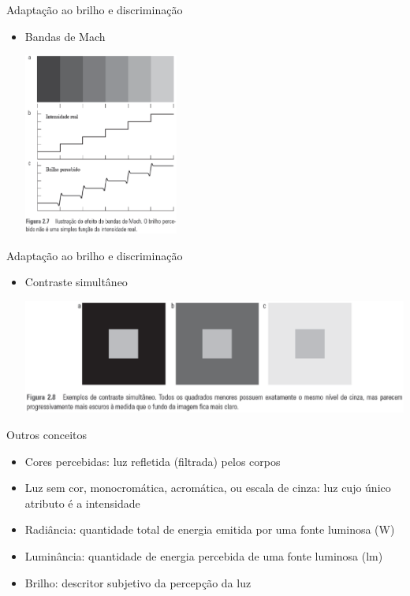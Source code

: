       \begin{slide}[toc=]{Adaptação ao brilho e discriminação}
         \begin{itemize}
            \item Bandas de Mach
            \begin{center}
               \includegraphics[width=0.4\textwidth]{figs/bmach_gw.eps}
            \end{center}
         \end{itemize}
      \end{slide}

      \begin{slide}[toc=]{Adaptação ao brilho e discriminação}
         \begin{itemize}
            \item Contraste simultâneo
            \begin{center}
               \includegraphics[width=\textwidth]{figs/csimul_gw.eps}
            \end{center}
         \end{itemize}
      \end{slide}

     
      \begin{slide}[toc=]{Outros conceitos}
         \begin{itemize}[type=1]
            \item Cores percebidas: luz refletida (filtrada) pelos corpos
            \item Luz sem cor, monocromática, acromática, ou escala de cinza: 
            luz cujo único atributo é a intensidade
            \item Radiância: quantidade total de energia emitida por uma fonte luminosa (W)
            \item Luminância: quantidade de energia percebida de uma fonte luminosa (lm)
            \item Brilho: descritor subjetivo da percepção da luz
         \end{itemize}         
      \end{slide}
      
